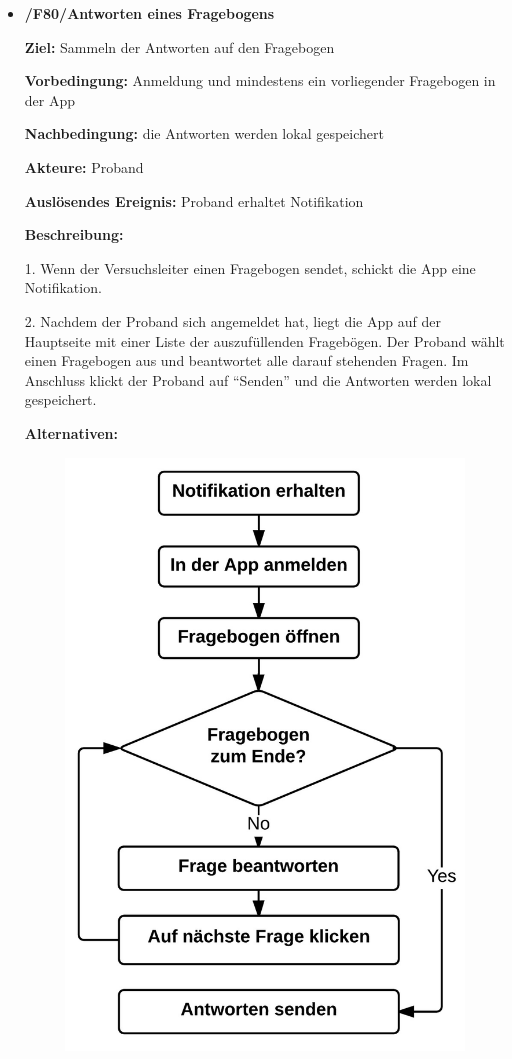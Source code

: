 \documentclass[a4paper]{scrreprt}
\begin{document}
\begin{itemize}
            \item \textbf{/F80/Antworten eines Fragebogens}

            	\par \textbf{Ziel: }Sammeln der Antworten auf den Fragebogen
            	\par \textbf{Vorbedingung: }Anmeldung und mindestens ein vorliegender Fragebogen in der App
            	\par \textbf{Nachbedingung: }die Antworten werden lokal gespeichert
            	\par \textbf{Akteure: }Proband
            	\par \textbf{Auslösendes Ereignis: }Proband erhaltet Notifikation
            	\par \textbf{Beschreibung: }
            	\par 1. Wenn der Versuchsleiter einen Fragebogen sendet, schickt die App eine Notifikation.
            	\par 2. Nachdem der Proband sich angemeldet hat, liegt die App auf der Hauptseite mit einer Liste der auszufüllenden Fragebögen. Der Proband wählt einen Fragebogen aus und beantwortet alle darauf stehenden Fragen. Im Anschluss klickt der Proband auf ``Senden'' und die Antworten werden lokal gespeichert.
            	\par \textbf{Alternativen: }
            	\begin{figure}[ht]
            		\centering
            		\includegraphics[scale=0.5]{AppAntworten.jpeg}

\end{figure}
\end{itemize}
\end{document}
